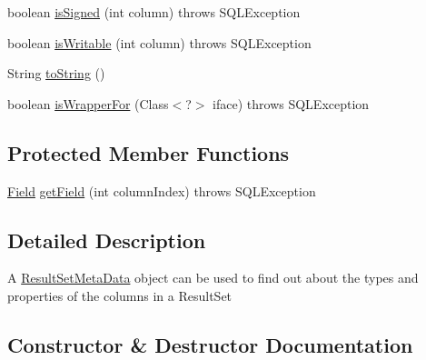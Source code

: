 \begin{DoxyCompactItemize}
\item 
boolean \mbox{\hyperlink{classcom_1_1mysql_1_1jdbc_1_1_result_set_meta_data_ae7aab7c643d23eb2ffd6a211abb9ac8f}{is\+Signed}} (int column)  throws S\+Q\+L\+Exception 
\item 
boolean \mbox{\hyperlink{classcom_1_1mysql_1_1jdbc_1_1_result_set_meta_data_aed2b92b641e72e924cbb58197487ced1}{is\+Writable}} (int column)  throws S\+Q\+L\+Exception 
\item 
String \mbox{\hyperlink{classcom_1_1mysql_1_1jdbc_1_1_result_set_meta_data_a4150d0a2d0c19586a87567890fb94253}{to\+String}} ()
\item 
boolean \mbox{\hyperlink{classcom_1_1mysql_1_1jdbc_1_1_result_set_meta_data_ac7d2fbe14fac5844be098c4d508a064d}{is\+Wrapper\+For}} (Class$<$?$>$ iface)  throws S\+Q\+L\+Exception 
\end{DoxyCompactItemize}
\subsection*{Protected Member Functions}
\begin{DoxyCompactItemize}
\item 
\mbox{\hyperlink{classcom_1_1mysql_1_1jdbc_1_1_field}{Field}} \mbox{\hyperlink{classcom_1_1mysql_1_1jdbc_1_1_result_set_meta_data_a5aa9a71bdb9452f61329796a7748988d}{get\+Field}} (int column\+Index)  throws S\+Q\+L\+Exception 
\end{DoxyCompactItemize}


\subsection{Detailed Description}
A \mbox{\hyperlink{classcom_1_1mysql_1_1jdbc_1_1_result_set_meta_data}{Result\+Set\+Meta\+Data}} object can be used to find out about the types and properties of the columns in a Result\+Set 

\subsection{Constructor \& Destructor Documentation}
\mbox{\label{classcom_1_1mysql_1_1jdbc_1_1_result_set_meta_data_a86e45ca80e9e4c95104a02e545ca60d6}} 
